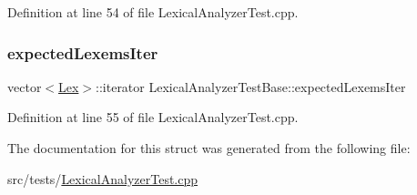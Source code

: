 Definition at line 54 of file Lexical\+Analyzer\+Test.\+cpp.

\mbox{\label{struct_lexical_analyzer_test_base_a38cbed88c599877db18b7b7522f6b65f}} 
\subsubsection{\texorpdfstring{expected\+Lexems\+Iter}{expectedLexemsIter}}
{\footnotesize\ttfamily vector$<$\hyperlink{classteam22_1_1_calc_1_1_lex}{Lex}$>$\+::iterator Lexical\+Analyzer\+Test\+Base\+::expected\+Lexems\+Iter}



Definition at line 55 of file Lexical\+Analyzer\+Test.\+cpp.



The documentation for this struct was generated from the following file\+:\begin{DoxyCompactItemize}
\item 
src/tests/\hyperlink{_lexical_analyzer_test_8cpp}{Lexical\+Analyzer\+Test.\+cpp}\end{DoxyCompactItemize}

